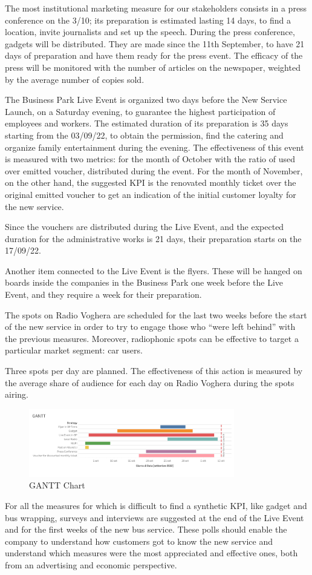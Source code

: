 The most institutional marketing measure for our stakeholders consists in a press conference on the 3/10; its preparation is estimated lasting 14 days, to find a location, invite journalists and set up the speech. During the press conference, gadgets will be distributed. They are made since the 11th September, to have 21 days of preparation and have them ready for the press event. The efficacy of the press will be monitored with the number of articles on the newspaper, weighted by the average number of copies sold.

The Business Park Live Event is organized two days before the New Service Launch, on a Saturday evening, to guarantee the highest participation of employees and workers. The estimated duration of its preparation is 35 days starting from the 03/09/22, to obtain the permission, find the catering and organize family entertainment during the evening. The effectiveness of this event is measured with two metrics: for the month of October with the ratio of used over emitted voucher, distributed during the event. For the month of November, on the other hand, the suggested KPI is the renovated monthly ticket over the original emitted voucher to get an indication of the initial customer loyalty for the new service.

Since the vouchers are distributed during the Live Event, and the expected duration for the administrative works is 21 days, their preparation starts on the 17/09/22.

Another item connected to the Live Event is the flyers. These will be hanged on boards inside the companies in the Business Park one week before the Live Event, and they require a week for their preparation.

The spots on Radio Voghera are scheduled for the last two weeks before the start of the new service in order to try to engage those who “were left behind” with the previous measures. Moreover, radiophonic spots can be effective to target a particular market segment: car users. 

Three spots per day are planned. The effectiveness of this action is measured by the average share of audience for each day on Radio Voghera during the spots airing.
\begin{figure}
    \centering
    \includegraphics[width=0.8\textwidth]{Images/merketing/gantt.png}
    \caption{GANTT Chart }
    \label{fig:gantt}
\end{figure}

For all the measures for which is difficult to find a synthetic KPI, like gadget and bus wrapping, surveys and interviews are suggested at the end of the Live Event and for the first weeks of the new bus service. These polls should enable the company to understand how customers got to know the new service and understand which measures were the most appreciated and effective ones, both from an advertising and economic perspective.


